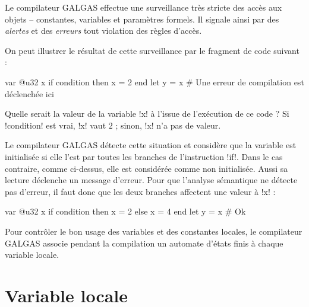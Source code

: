 
\newcommand\FlecheEtatInitial[2]{
  \node[#2 of #1,draw=black,circle,thick,fill=\FondAutomate] (Z) {};
  \draw[-stealth,thick,black] (Z) -- (#1);
}


Le compilateur GALGAS effectue une surveillance très stricte des accès aux objets -- constantes, variables et paramètres formels. Il signale ainsi par des \emph{alertes} et des \emph{erreurs} tout violation des règles d'accès.

On peut illustrer le résultat de cette surveillance par le fragment de code suivant :
\begin{galgas4}
var @u32 x
if condition then
  x = 2
end
let y = x # Une erreur de compilation est déclenchée ici
\end{galgas4}

Quelle serait la valeur de la variable \ggsq!x! à l'issue de l'exécution de ce code ? Si \ggsq!condition! est vrai, \ggsq!x! vaut $2$ ; sinon, \ggsq!x! n'a pas de valeur.

Le compilateur GALGAS détecte cette situation et considère que la variable est initialisée si elle l'est par toutes les branches de l'instruction \ggsq!if!. Dans le cas contraire, comme ci-dessus, elle est considérée comme non initialisée. Aussi sa lecture déclenche un message d'erreur. Pour que l'analyse sémantique ne détecte pas d'erreur, il faut donc que les deux branches affectent une valeur à \ggsq!x! :

\begin{galgas4}
var @u32 x
if condition then
  x = 2
else
  x = 4
end
let y = x # Ok
\end{galgas4}

Pour contrôler le bon usage des variables et des constantes locales, le compilateur GALGAS associe pendant la compilation un automate d'états finis à chaque variable locale.














\section{Variable locale}

